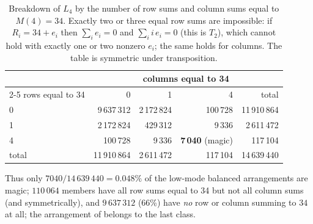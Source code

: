 \begin{table}[H]
\centering
\caption{Breakdown of $L_4$ by the number of row sums and column sums equal to $M(4)=34$.
Exactly two or three equal row sums are impossible: if $R_i=34+e_i$ then $\sum_i e_i=0$ and
$\sum_i i\,e_i=0$ (this is $T_2$), which cannot hold with exactly one or two nonzero $e_i$;
the same holds for columns.  The table is symmetric under transposition.}
\label{tab:L4}
\begin{tabular}{lrrrr}
\toprule
 & \multicolumn{4}{c}{columns equal to 34} \\
\cmidrule(lr){2-5}
rows equal to 34 & 0 & 1 & 4 & total \\
\midrule
0 & 9\,637\,312 & 2\,172\,824 & 100\,728 & 11\,910\,864 \\
1 & 2\,172\,824 & 429\,312 & 9\,336 & 2\,611\,472 \\
4 & 100\,728 & 9\,336 & \textbf{7\,040} (magic) & 117\,104 \\
\midrule
total & 11\,910\,864 & 2\,611\,472 & 117\,104 & 14\,639\,440 \\
\bottomrule
\end{tabular}
\end{table}

Thus only $7040/14\,639\,440 = 0.048\%$ of the low-mode balanced arrangements are magic;
$110\,064$ members have all row sums equal to 34 but not all column sums (and symmetrically),
and $9\,637\,312$ (66\%) have \emph{no} row or column summing to $34$ at all; the arrangement
of  belongs to the last class.

